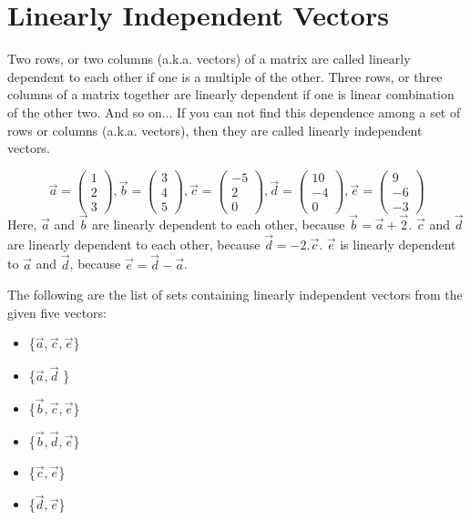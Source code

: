 \documentclass[conference,final,11pt,technote,onecolumn]{IEEEtran}\usepackage[]{graphicx}\usepackage[]{color}
\begin{document}
	

	\section{Linearly Independent Vectors}
	\label{term:linearly_independent_vectors}
Two rows, or two columns (a.k.a. vectors) of a matrix are called linearly dependent to each other if one is a multiple of the other. Three rows, or three columns of a matrix together are linearly dependent if one is linear combination of the other two. And so on... If you can not find this dependence among a set of rows or columns (a.k.a. vectors), then they are called linearly independent vectors.

\[
\vec a = \begin{pmatrix}
1\\
2\\
3
\end{pmatrix}, \vec b = \begin{pmatrix}
3\\
4\\
5
\end{pmatrix}, \vec c = \begin{pmatrix}
-5\\
2\\
0
\end{pmatrix}, \vec d = \begin{pmatrix}
10\\
-4\\
0
\end{pmatrix}, \vec e = \begin{pmatrix}
9\\
-6\\
-3
\end{pmatrix}
\]
Here, $\vec a$ and $\vec b$ are linearly dependent to each other, because $\vec b = \vec a + \vec 2$. $\vec c$ and $\vec d$ are linearly dependent to each other, because $\vec d = -2 . \vec c$. $\vec e$ is linearly dependent to $\vec a$ and $\vec d$, because $\vec e = \vec d - \vec a$. 

The following are the list of sets containing linearly independent vectors from the given five vectors:
\begin{itemize}
\item \{$\vec a, \vec c, \vec e$\}
\item \{$\vec a, \vec d$ \}
\item \{$\vec b, \vec c, \vec e$\}
\item \{$\vec b, \vec d, \vec e$\}
\item \{$\vec c, \vec e$\}
\item \{$\vec d, \vec e$\}
\end{itemize}
\end{document}
